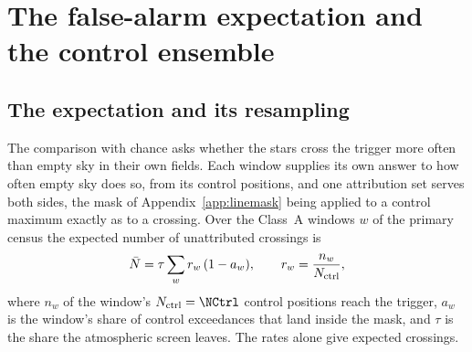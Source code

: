 \section{The false-alarm expectation and the control ensemble}
\label{app:falsealarm}

\subsection{The expectation and its resampling}

The comparison with chance asks whether the stars cross the trigger more
often than empty sky in their own fields. Each window supplies
its own answer to how often empty sky does so, from its control positions,
and one attribution set serves both sides, the mask of
Appendix~\ref{app:linemask} being applied to a control maximum exactly as to
a crossing. Over the \CeNWin{} Class~A windows $w$ of the primary census the
expected number of unattributed crossings is
\begin{equation*}
\bar N=\tau\sum_{w}r_w\,(1-a_w),\qquad r_w=\frac{n_w}{N_{\rm ctrl}},
\end{equation*}
where $n_w$ of the window's $N_{\rm ctrl}=\NCtrl$ control positions reach the
trigger, $a_w$ is the window's share of control exceedances that land
inside the mask, and $\tau$ is the share the atmospheric screen leaves. The rates alone
give \CeExpTrig{} expected crossings.

